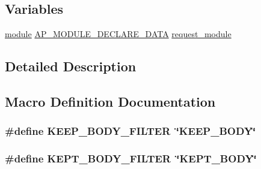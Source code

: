 \subsection*{Variables}
\begin{DoxyCompactItemize}
\item 
\hyperlink{group__APACHE__CORE__CONFIG_ga0ea4f633a5f9f88e1603aaeb1f2b2e69}{module} \hyperlink{ap__config_8h_ae2cb2b956e7f274f8d91581331debbe0}{A\+P\+\_\+\+M\+O\+D\+U\+L\+E\+\_\+\+D\+E\+C\+L\+A\+R\+E\+\_\+\+D\+A\+TA} \hyperlink{group__MOD__REQUEST_ga9cfd2b3b748e96215ef549fe178a52a9}{request\+\_\+module}
\end{DoxyCompactItemize}


\subsection{Detailed Description}


\subsection{Macro Definition Documentation}
\subsubsection[{\texorpdfstring{K\+E\+E\+P\+\_\+\+B\+O\+D\+Y\+\_\+\+F\+I\+L\+T\+ER}{KEEP_BODY_FILTER}}]{\setlength{\rightskip}{0pt plus 5cm}\#define K\+E\+E\+P\+\_\+\+B\+O\+D\+Y\+\_\+\+F\+I\+L\+T\+ER~\char`\"{}K\+E\+E\+P\+\_\+\+B\+O\+DY\char`\"{}}\hypertarget{group__MOD__REQUEST_ga250b1ac1f8c71b519dcfd2c8bf62827a}{}\label{group__MOD__REQUEST_ga250b1ac1f8c71b519dcfd2c8bf62827a}
\subsubsection[{\texorpdfstring{K\+E\+P\+T\+\_\+\+B\+O\+D\+Y\+\_\+\+F\+I\+L\+T\+ER}{KEPT_BODY_FILTER}}]{\setlength{\rightskip}{0pt plus 5cm}\#define K\+E\+P\+T\+\_\+\+B\+O\+D\+Y\+\_\+\+F\+I\+L\+T\+ER~\char`\"{}K\+E\+P\+T\+\_\+\+B\+O\+DY\char`\"{}}\hypertarget{group__MOD__REQUEST_ga69b76f49ada6b0f7f3887a8bb36a3437}{}\label{group__MOD__REQUEST_ga69b76f49ada6b0f7f3887a8bb36a3437}


